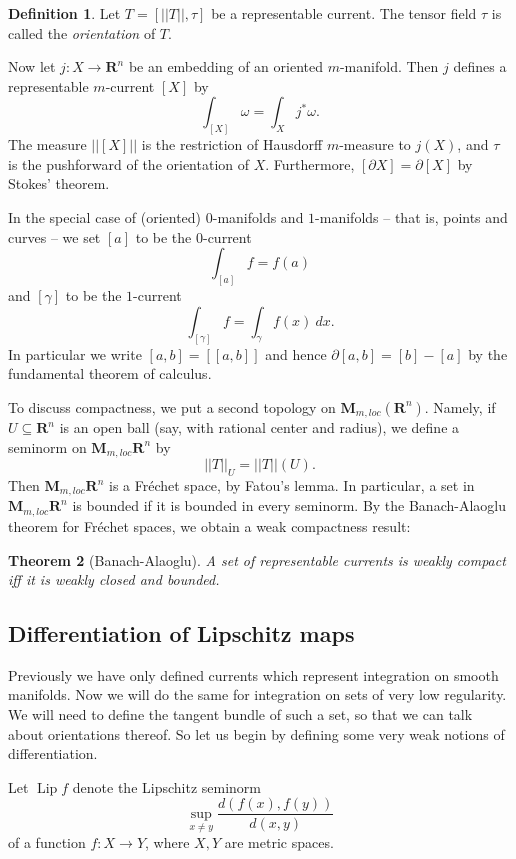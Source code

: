 \documentclass[reqno,12pt,letterpaper]{amsart}
\newcommand{\RR}{\mathbf{R}}
\newcommand{\MM}{\mathbf M}
\DeclareMathOperator{\Lip}{Lip}
\newcommand{\dfn}[1]{\emph{#1}\index{#1}}
\newtheorem{theorem}{Theorem}[section]
\theoremstyle{definition}
\newtheorem{definition}[theorem]{Definition}
\numberwithin{equation}{section}
\begin{document}
\begin{definition}
Let $T = [||T||, \tau]$ be a representable current.
The tensor field $\tau$ is called the \dfn{orientation} of $T$.
\end{definition}

Now let $j: X \to \RR^n$ be an embedding of an oriented $m$-manifold.
Then $j$ defines a representable $m$-current $[X]$ by
$$\int_{[X]} \omega = \int_X j^*\omega.$$
The measure $||[X]||$ is the restriction of Hausdorff $m$-measure to $j(X)$, and $\tau$ is the pushforward of the orientation of $X$.
Furthermore, $[\partial X] = \partial[X]$ by Stokes' theorem.

In the special case of (oriented) $0$-manifolds and $1$-manifolds -- that is, points and curves -- we set $[a]$ to be the $0$-current
$$\int_{[a]} f = f(a)$$
and $[\gamma]$ to be the $1$-current
$$\int_{[\gamma]} f = \int_\gamma f(x) ~dx.$$
In particular we write $[a, b] = [[a, b]]$ and hence $\partial[a,b] = [b] - [a]$ by the fundamental theorem of calculus.

To discuss compactness, we put a second topology on $\MM_{m,loc}(\RR^n)$.
Namely, if $U \subseteq \RR^n$ is an open ball (say, with rational center and radius), we define a seminorm on $\MM_{m,loc}\RR^n$ by
$$||T||_U = ||T||(U).$$
Then $\MM_{m,loc}\RR^n$ is a Fr\'echet space, by Fatou's lemma.
In particular, a set in $\MM_{m,loc}\RR^n$ is bounded if it is bounded in every seminorm.
By the Banach-Alaoglu theorem for Fr\'echet spaces, we obtain a weak compactness result:

\begin{theorem}[Banach-Alaoglu]
A set of representable currents is weakly compact iff it is weakly closed and bounded.
\end{theorem}

\subsection{Differentiation of Lipschitz maps}
Previously we have only defined currents which represent integration on smooth manifolds.
Now we will do the same for integration on sets of very low regularity.
We will need to define the tangent bundle of such a set, so that we can talk about orientations thereof.
So let us begin by defining some very weak notions of differentiation.

Let $\Lip f$ denote the Lipschitz seminorm
$$\sup_{x \neq y} \frac{d(f(x), f(y))}{d(x, y)}$$
of a function $f: X \to Y$, where $X,Y$ are metric spaces.
\end{document}

